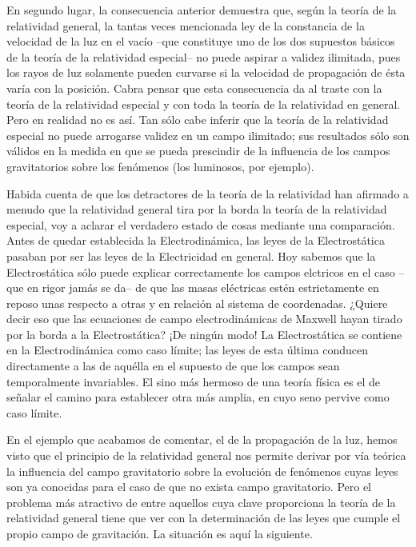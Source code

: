 \documentclass[spanish]{book}
\begin{document}
En segundo lugar, la consecuencia anterior demuestra que, según la teoría de la
relatividad general, la tantas veces mencionada ley de la constancia de la velocidad de
la luz en el vacío --que constituye uno de los dos supuestos básicos de la teoría de la
relatividad especial-- no puede aspirar a validez ilimitada, pues los rayos de luz
solamente pueden curvarse si la velocidad de propagación de ésta varía con la posición.
Cabra pensar que esta consecuencia da al traste con la teoría de la relatividad especial
y con toda la teoría de la relatividad en general. Pero en realidad no es así. Tan sólo
cabe inferir que la teoría de la relatividad especial no puede arrogarse validez en un
campo ilimitado; sus resultados sólo son válidos en la medida en que se pueda
prescindir de la influencia de los campos gravitatorios sobre los fenómenos (los
luminosos, por ejemplo).

Habida cuenta de que los detractores de la teoría de la relatividad han afirmado a
menudo que la relatividad general tira por la borda la teoría de la relatividad especial,
voy a aclarar el verdadero estado de cosas mediante una comparación. Antes de quedar
establecida la Electrodinámica, las leyes de la Electrostática pasaban por ser las leyes
de la Electricidad en general. Hoy sabemos que la Electrostática sólo puede explicar
correctamente los campos elctricos en el caso --que en rigor jamás se da-- de que las
masas eléctricas estén estrictamente en reposo unas respecto a otras y en relación al
sistema de coordenadas. ¿Quiere decir eso que las ecuaciones de campo
electrodinámicas de Maxwell hayan tirado por la borda a la Electrostática? ¡De ningún
modo! La Electrostática se contiene en la Electrodinámica como caso límite; las leyes
de esta última conducen directamente a las de aquélla en el supuesto de que los
campos sean temporalmente invariables. El sino más hermoso de una teoría física es
el de señalar el camino para establecer otra más amplia, en cuyo seno pervive como
caso límite.

En el ejemplo que acabamos de comentar, el de la propagación de la luz, hemos
visto que el principio de la relatividad general nos permite derivar por vía teórica la
influencia del campo gravitatorio sobre la evolución de fenómenos cuyas leyes son ya
conocidas para el caso de que no exista campo gravitatorio. Pero el problema más
atractivo de entre aquellos cuya clave proporciona la teoría de la relatividad general
tiene que ver con la determinación de las leyes que cumple el propio campo de
gravitación. La situación es aquí la siguiente.
\end{document}
